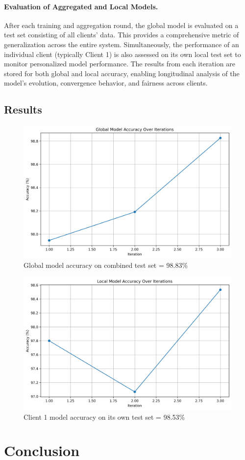 \documentclass[10pt]{article}
\begin{document}
\paragraph{Evaluation of Aggregated and Local Models.}
After each training and aggregation round, the global model is evaluated on a test set consisting of all clients’ data. This provides a comprehensive metric of generalization across the entire system. Simultaneously, the performance of an individual client (typically Client 1) is also assessed on its own local test set to monitor personalized model performance.
The results from each iteration are stored for both global and local accuracy, enabling longitudinal analysis of the model's evolution, convergence behavior, and fairness across clients.
\subsection{Results}
\begin{figure}[H]
	\centering
	\includegraphics[height = 0.4\textheight]{img/global_model_accuracy.png}
    \caption{Global model accuracy on combined test set = 98.83\%}
\end{figure}
\begin{figure}[H]
    \centering
    \includegraphics[height = 0.4\textheight]{img/local_model_accuracy.png}
    \caption{Client 1 model accuracy on its own test set = 98.53\%}
\end{figure}


\section{Conclusion}




\end{document}
